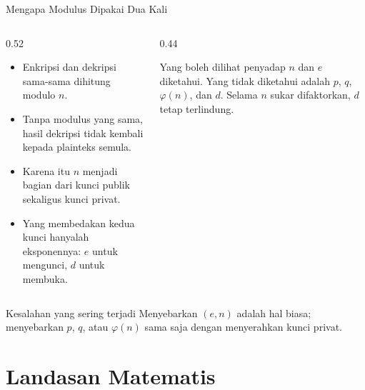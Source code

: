 \documentclass[aspectratio=169,11pt]{beamer}
\begin{document}
\begin{frame}{Mengapa Modulus Dipakai Dua Kali}
    \footnotesize
    \begin{columns}[T,onlytextwidth]
        \begin{column}{0.52\textwidth}
            \begin{itemize}
                \item Enkripsi dan dekripsi sama-sama dihitung modulo $n$.
                \item Tanpa modulus yang sama, hasil dekripsi tidak kembali
                      kepada plainteks semula.
                \item Karena itu $n$ menjadi bagian dari kunci publik
                      sekaligus kunci privat.
                \item Yang membedakan kedua kunci hanyalah eksponennya:
                      $e$ untuk mengunci, $d$ untuk membuka.
            \end{itemize}
        \end{column}
        \begin{column}{0.44\textwidth}
            \begin{block}{Yang boleh dilihat penyadap}
                $n$ dan $e$ diketahui. Yang tidak diketahui adalah $p$, $q$,
                $\varphi(n)$, dan $d$. Selama $n$ sukar difaktorkan, $d$
                tetap terlindung.
            \end{block}
        \end{column}
    \end{columns}
    \vspace{0.15cm}
    \begin{alertblock}{Kesalahan yang sering terjadi}
        \footnotesize
        Menyebarkan $(e,n)$ adalah hal biasa; menyebarkan $p$, $q$, atau
        $\varphi(n)$ sama saja dengan menyerahkan kunci privat.
    \end{alertblock}
\end{frame}

\section{Landasan Matematis}
\end{document}
